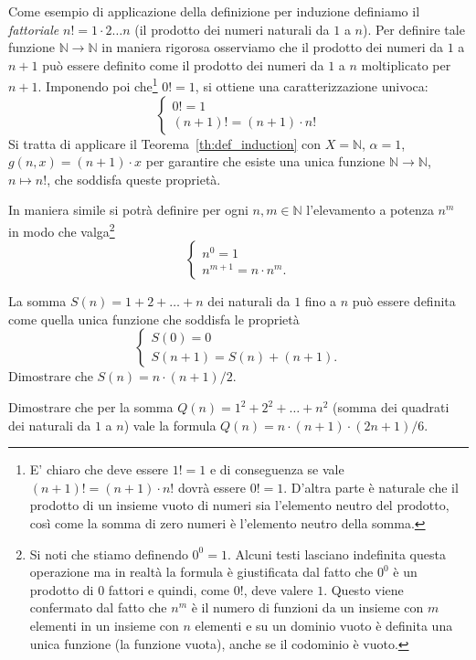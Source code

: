 \documentclass[italian,a4paper,hidelinks]{scrartcl}
\newcommand{\NN}{{\mathbb N}}
\begin{document}
Come esempio di applicazione della definizione per induzione definiamo
il \emph{fattoriale} $n! = 1 \cdot 2 \dots n$ (il prodotto dei numeri naturali
da $1$ a $n$).
Per definire tale funzione
$\NN \to \NN$ in maniera rigorosa osserviamo che il prodotto dei numeri da $1$
a $n+1$ può essere definito come il prodotto dei numeri da $1$ a $n$ moltiplicato
per $n+1$. Imponendo poi che\footnote{%
E' chiaro che deve essere $1!=1$ e di conseguenza se vale $(n+1)! = (n+1)\cdot n!$
dovrà essere $0!=1$.
D'altra parte è naturale che il prodotto di un insieme vuoto di numeri sia
l'elemento neutro del prodotto, così come la somma di zero numeri è l'elemento
neutro della somma.
}
$0!=1$, si ottiene una caratterizzazione univoca:
\[
 \begin{cases}
  0! = 1 \\
  (n+1)! = (n+1) \cdot n!
 \end{cases}
\]
Si tratta di applicare il Teorema~\ref{th:def_induction}
con $X=\NN$, $\alpha = 1$, $g(n, x) = (n+1)\cdot x$ per garantire che esiste
una unica funzione $\NN\to\NN$, $n\mapsto n!$, che soddisfa queste proprietà.

In maniera simile si potrà definire per ogni $n,m \in \NN$ l'elevamento a potenza $n^m$
in modo che valga\footnote{%
Si noti che stiamo definendo $0^0=1$.
Alcuni testi lasciano indefinita questa operazione ma in realtà la formula
è giustificata dal fatto che $0^0$ è un prodotto di $0$ fattori e quindi,
come $0!$, deve valere $1$.
Questo viene confermato dal fatto che $n^m$ è il numero di funzioni da un
insieme con $m$ elementi in un insieme con $n$ elementi e
su un dominio vuoto è definita una unica funzione (la funzione vuota), anche
se il codominio è vuoto.
}
\[
\begin{cases}
  n^0 = 1\\
  n^{m+1} = n\cdot n^m.
\end{cases}
\]

\begin{exercise}
La somma $S(n) = 1 + 2 + \dots +n$
dei naturali da $1$ fino a $n$ può essere definita come quella unica funzione
che soddisfa le proprietà
\[
\begin{cases}
  S(0) = 0 \\
  S(n+1) = S(n) + (n+1).
\end{cases}
\]
Dimostrare che $S(n) = n \cdot (n+1) / 2$.
\end{exercise}

\begin{exercise}
Dimostrare che per la somma
$Q(n) = 1^2 + 2^2 + \dots + n^2$
(somma dei quadrati dei naturali da $1$ a $n$)
vale la formula
$Q(n) = n \cdot (n+1)\cdot (2n + 1) / 6$.
\end{exercise}
\end{document}
